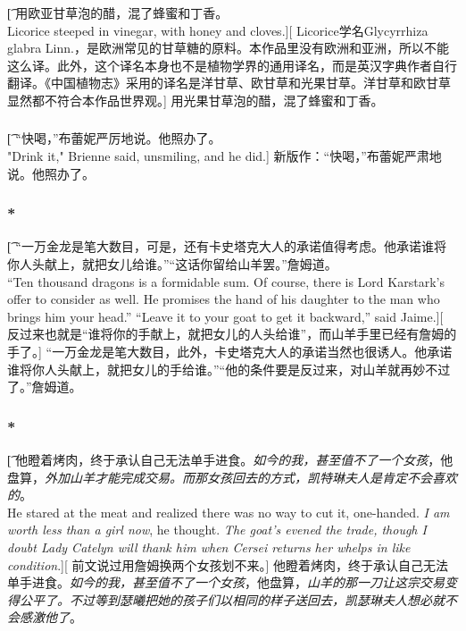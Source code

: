 \documentclass[12pt,a4paper]{article}
\begin{document}
\subsubsection{}\t[	
	用欧亚甘草泡的醋，混了蜂蜜和丁香。\\
	Licorice steeped in vinegar, with honey and cloves.][
	Licorice学名Glycyrrhiza glabra Linn.，是欧洲常见的甘草糖的原料。本作品里没有欧洲和亚洲，所以不能这么译。此外，这个译名本身也不是植物学界的通用译名，而是英汉字典作者自行翻译。《中国植物志》采用的译名是洋甘草、欧甘草和光果甘草。洋甘草和欧甘草显然都不符合本作品世界观。]
	用光果甘草泡的醋，混了蜂蜜和丁香。	
	
\subsubsection{}\t[	
	“快喝，”布蕾妮严厉地说。他照办了。\\
	"Drink it," Brienne said, unsmiling, and he did.]
	新版作：“快喝，”布蕾妮严肃地说。他照办了。
	
\subsubsection{\color{red}*}\t[
	 “一万金龙是笔大数目，可是，还有卡史塔克大人的承诺值得考虑。他承诺谁将你人头献上，就把女儿给谁。”“这话你留给山羊罢。”詹姆道。\\
	 “Ten thousand dragons is a formidable sum. Of course, there is Lord Karstark's offer to consider as well. He promises the hand of his daughter to the man who brings him your head.” “Leave it to your goat to get it backward,” said Jaime.][
	 反过来也就是“谁将你的手献上，就把女儿的人头给谁”，而山羊手里已经有詹姆的手了。]
	 “一万金龙是笔大数目，此外，卡史塔克大人的承诺当然也很诱人。他承诺谁将你人头献上，就把女儿的手给谁。”“他的条件要是反过来，对山羊就再妙不过了。”詹姆道。
	 
\subsubsection{\color{red}*}\t[
	 他瞪着烤肉，终于承认自己无法单手进食。\emph{如今的我，甚至值不了一个女孩}，他盘算，\emph{外加山羊才能完成交易。而那女孩回去的方式，凯特琳夫人是肯定不会喜欢的}。\\
	 He stared at the meat and realized there was no way to cut it, one-handed. \emph{I am worth less than a girl now}, he thought. \emph{The goat's evened the trade, though I doubt Lady Catelyn will thank him when Cersei returns her whelps in like condition}.][
	 前文说过用詹姆换两个女孩划不来。]
	 他瞪着烤肉，终于承认自己无法单手进食。\emph{如今的我，甚至值不了一个女孩}，他盘算，\emph{山羊的那一刀让这宗交易变得公平了。不过等到瑟曦把她的孩子们以相同的样子送回去，凯瑟琳夫人想必就不会感激他了}。
	 
\end{document}
